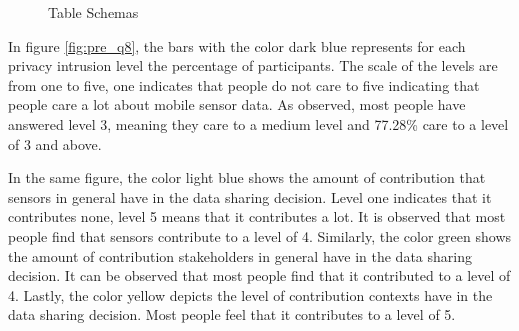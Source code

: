 \begin{figure}[htp]
\hspace{1em}
\caption{Table Schemas}
\label{fig:s3}
\end{figure}

In figure \ref{fig:pre_q8}, the bars with the color dark blue represents for each privacy intrusion level the percentage of participants. The scale of the levels are from one to five, one indicates that people do not care to five indicating that people care a lot about mobile sensor data. As observed, most people have answered level 3, meaning they care to a medium level and 77.28\% care to a level of 3 and above.

In the same figure, the color light blue shows the amount of contribution that sensors in general have in the data sharing decision. Level one indicates that it contributes none, level 5 means that it contributes a lot. It is observed that most people find that sensors contribute to a level of 4. Similarly, the color green shows the amount of contribution stakeholders in general have in the data sharing decision. It can be observed that most people find that it contributed to a level of 4. Lastly, the color yellow depicts the level of contribution contexts have in the data sharing decision. Most people feel that it contributes to a level of 5.

